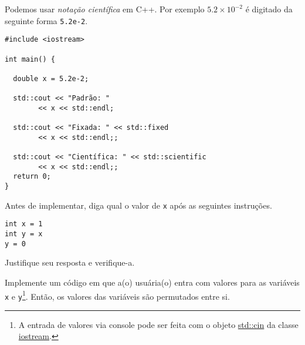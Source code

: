 \documentclass[12pt]{article}
\begin{document}
\begin{obs}
  Podemos usar \emph{notação científica} em C++. Por exemplo $5.2\times 10^{-2}$ é digitado da seguinte forma \lstinline+5.2e-2+.

\begin{lstlisting}[caption=notacaoCientifica.cpp]
#include <iostream>

int main() {

  double x = 5.2e-2;
  
  std::cout << "Padrão: "
	    << x << std::endl;

  std::cout << "Fixada: " << std::fixed
	    << x << std::endl;;

  std::cout << "Científica: " << std::scientific
	    << x << std::endl;;
  return 0;
}
\end{lstlisting}
\end{obs}

\begin{exr}
  Antes de implementar, diga qual o valor de \lstinline+x+ após as seguintes instruções.
\begin{lstlisting}
int x = 1
int y = x
y = 0
\end{lstlisting}
  Justifique seu resposta e verifique-a.
\end{exr}

\begin{exr}
  Implemente um código em que a(o) usuária(o) entra com valores para as variáveis \lstinline+x+ e \lstinline+y+\footnote{A entrada de valores via console pode ser feita com o objeto \href{https://en.cppreference.com/w/cpp/io/cin}{std::cin} da classe \href{https://en.cppreference.com/w/cpp/io/basic_istream}{iostream}.}. Então, os valores das variáveis são permutados entre si.
\end{exr}


\end{document}
